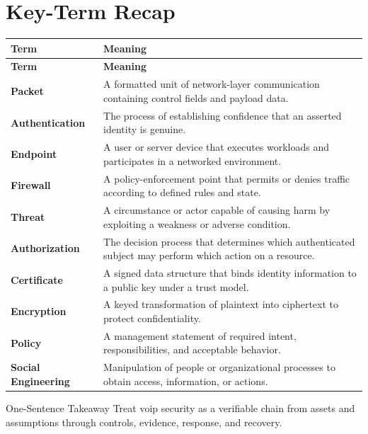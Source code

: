 \documentclass[11pt,letterpaper]{article}
\begin{document}
\section*{Key-Term Recap}
\begin{longtable}{>{\raggedright\arraybackslash}p{}>{\raggedright\arraybackslash}p{}}
\toprule\rowcolor{Navy}\color{white}\textbf{Term} & \color{white}\textbf{Meaning}\\\midrule
\endfirsthead
\toprule\rowcolor{Navy}\color{white}\textbf{Term} & \color{white}\textbf{Meaning}\\\midrule
\endhead
\textbf{Packet} & A formatted unit of network-layer communication containing control fields and payload data. \\\midrule
\textbf{Authentication} & The process of establishing confidence that an asserted identity is genuine. \\\midrule
\textbf{Endpoint} & A user or server device that executes workloads and participates in a networked environment. \\\midrule
\textbf{Firewall} & A policy-enforcement point that permits or denies traffic according to defined rules and state. \\\midrule
\textbf{Threat} & A circumstance or actor capable of causing harm by exploiting a weakness or adverse condition. \\\midrule
\textbf{Authorization} & The decision process that determines which authenticated subject may perform which action on a resource. \\\midrule
\textbf{Certificate} & A signed data structure that binds identity information to a public key under a trust model. \\\midrule
\textbf{Encryption} & A keyed transformation of plaintext into ciphertext to protect confidentiality. \\\midrule
\textbf{Policy} & A management statement of required intent, responsibilities, and acceptable behavior. \\\midrule
\textbf{Social Engineering} & Manipulation of people or organizational processes to obtain access, information, or actions. \\\midrule
\bottomrule
\end{longtable}
\begin{CornellExamBox}{One-Sentence Takeaway}
Treat voip security as a verifiable chain from assets and assumptions through controls, evidence, response, and recovery.
\end{CornellExamBox}
\end{document}
